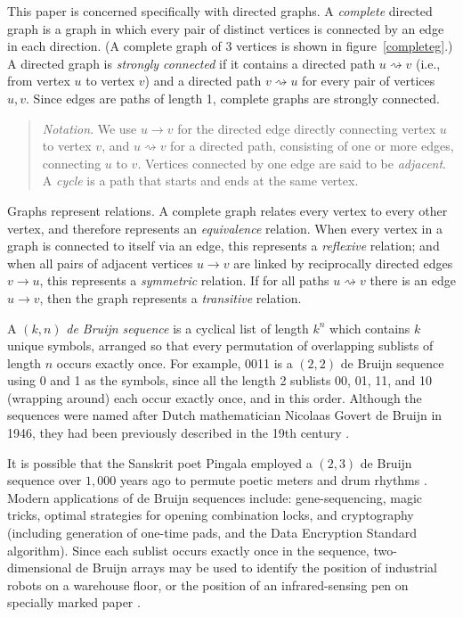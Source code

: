 \documentclass[12pt]{article}
\begin{document}
This paper is concerned specifically with directed graphs. A \emph{complete\/} directed graph is a graph in which every pair of distinct vertices is connected by an edge in each direction. (A complete graph of 3 vertices is shown in figure~\ref{completeg}.) A directed graph is \emph{strongly connected\/} if it contains a directed path $u \rightsquigarrow v$ (i.e., from vertex $u$ to vertex $v$) and a directed path $v \rightsquigarrow u$ for every pair of vertices $u,v$. Since edges are paths of length 1, complete graphs are strongly connected.

\begin{quote}\raggedright\emph{Notation}. We use $u \rightarrow v$ for the directed edge directly connecting vertex $u$ to vertex $v$, and $u \rightsquigarrow v$ for a directed path, consisting of one or more edges, connecting $u$ to $v$. Vertices connected by one edge are said to be \emph{adjacent}. A \emph{cycle\/} is a path that starts and ends at the same vertex.\end{quote}

Graphs represent relations. A complete graph relates every vertex to every other vertex, and therefore represents an \emph{equivalence\/} relation. When every vertex in a graph is connected to itself via an edge, this represents a \emph{reflexive\/} relation; and when all pairs of adjacent vertices $u \rightarrow v$ are linked by reciprocally directed edges $v \rightarrow u$, this represents a \emph{symmetric\/} relation. If for all paths $u \rightsquigarrow v$ there is an edge $u \rightarrow v$, then the graph represents a \emph{transitive\/} relation.

A $(k,n)$ \emph{de Bruijn sequence\/} is a cyclical list of length $k^n$ which contains $k$ unique symbols, arranged so that every permutation of overlapping sublists of length $n$ occurs exactly once. For example, 0011 is a $(2,2)$ de Bruijn sequence using 0 and 1 as the symbols, since all the length 2 sublists 00, 01, 11, and 10 (wrapping around) each occur exactly once, and in this order.
Although the sequences were named after Dutch mathematician Nicolaas Govert de Bruijn \cite{debruijn} in 1946, they had been previously described in the  19th century \cite{fleury,sainte-marie}.

It is possible that the Sanskrit poet Pingala employed a $(2,3)$ de Bruijn sequence over $1,000$ years ago to permute poetic meters and drum rhythms \cite{hall,knuth4a}. Modern applications of de Bruijn sequences include: gene-sequencing, magic tricks, optimal strategies for opening combination locks, and cryptography (including generation of one-time pads, and the Data Encryption Standard algorithm). Since each sublist occurs exactly once in the sequence, two-dimensional de Bruijn arrays may be used to identify the position of industrial robots on a warehouse floor, or the position of an infrared-sensing pen on specially marked paper \cite{diaconis}.
\end{document}
